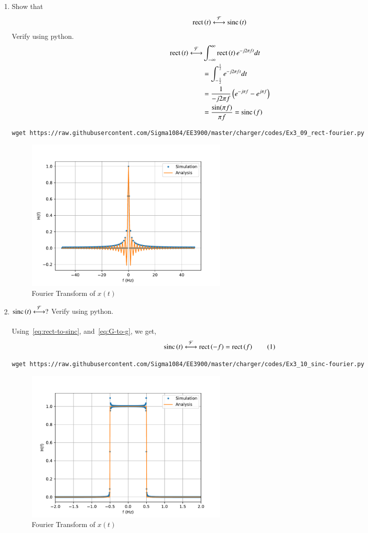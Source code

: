 \documentclass[journal,12pt,twocolumn]{IEEEtran}
\renewcommand\thesection{\arabic{section}}
\begin{document}
\begin{enumerate}[label=\thesection.\arabic*, ref=\thesection.\theenumi]
\item Show that
	\begin{align}
		\text{rect}\left(t\right) \overset{\mathcal{F}}{ \longleftrightarrow} \text{sinc}\left(t\right)
		\label{eq:rect-to-sinc}
	\end{align}
	Verify using python. \\
	\solution
	\begin{align*}
		\text{rect}\left(t\right) \overset{\mathcal{F}}{ \longleftrightarrow} & \int_{-\infty}^\infty \text{rect}\left(t\right) e^{-j2\pi ft} dt \\
		&= \int_{-\frac{1}{2}}^{\frac{1}{2}} e^{-j2\pi ft} dt \\
		&= \frac{1}{-j2\pi f} \left(e^{-j\pi f} - e^{j\pi f}\right) \\
		&= \frac{\sin(\pi f)}{\pi f} = \text{sinc}\left(f\right)
	\end{align*}
	\begin{lstlisting}
wget https://raw.githubusercontent.com/Sigma1084/EE3900/master/charger/codes/Ex3_09_rect-fourier.py
	\end{lstlisting}
	\begin{figure}[h]
		\centering
		\includegraphics[width=0.5\textwidth]{figs/Ex3_09_verify_rect_fourier}
		\caption{Fourier Transform of $x(t)$}
		\label{fig:verify_rect_fourier}
	\end{figure}


\item 
	$\text{sinc}\left(t\right)\overset{\mathcal{F}}{ \longleftrightarrow} ?$
	Verify using python. \\
	\solution \\
	Using~\eqref{eq:rect-to-sinc}, and~\eqref{eq:G-to-g}, we get,
	\[ \sinc{t} \system{F} \rect{-f} = \rect{f} \numberthis \label{eq:sinc-to-rect} \]
	\begin{lstlisting}
wget https://raw.githubusercontent.com/Sigma1084/EE3900/master/charger/codes/Ex3_10_sinc-fourier.py
	\end{lstlisting}
	\begin{figure}[h]
		\centering
		\includegraphics[width=0.5\textwidth]{figs/Ex3_10_verify_sinc_fourier}
		\caption{Fourier Transform of $x(t)$}
		\label{fig:verify_sinc_fourier}
	\end{figure}

\end{enumerate}
\end{document}

